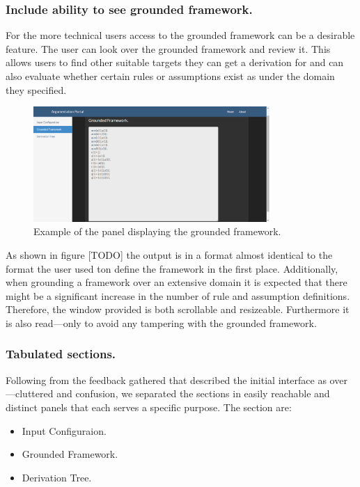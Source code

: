 \subsubsection{Include ability to see grounded framework.}
For the more technical users access to the grounded framework can be a desirable feature. The user can look over the grounded framework and review it. This allows users to find other suitable targets they can get a derivation for and can also evaluate whether certain rules or assumptions exist as under the domain they specified.

\begin{figure}[h]
    \centering
    \includegraphics[width=0.8\textwidth]{argumentationGrounded.png}
    \caption{Example of the panel displaying the grounded framework.}
    \label{fig:arg_grounded}
\end{figure}

As shown in figure [TODO] the output is in a format almost identical to the format the user used ton define the framework in the first place. Additionally, when grounding a framework over an extensive domain it is expected that there might be a significant increase in the number of rule and assumption definitions. Therefore, the window provided is both scrollable and resizeable. Furthermore it is also read---only to avoid any tampering with the grounded framework.

\subsubsection{Tabulated sections.}
Following from the feedback gathered that described the initial interface as over---cluttered and confusion, we separated the sections in easily reachable and distinct panels that each serves a specific purpose. The section are:

\begin{itemize}
\item Input Configuraion.
\item Grounded Framework.
\item Derivation Tree.
\end{itemize}

